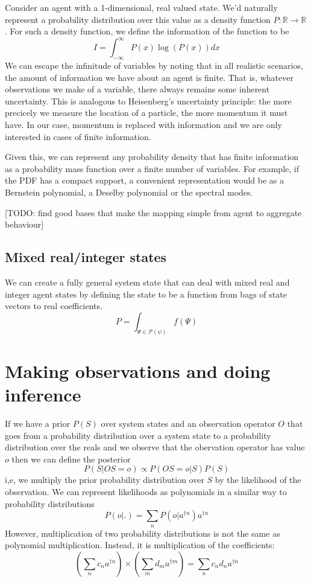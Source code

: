 \documentclass[letterpaper,twocolumn,10pt]{article}
\begin{document}
Consider an agent with a 1-dimensional, real valued state. We'd naturally represent a probability distribution over this value as a density function $P:\mathbb{R} \rightarrow \mathbb{R}$. For such a density function, we define the information of the function to be
\[
I = \int_{-\infty}^\infty P(x) \log(P(x)) dx
\]
We can escape the infinitude of variables by noting that in all realistic scenarios, the amount of information we have about an agent is finite. That is, whatever observations we make of a variable, there always remains some inherent uncertainty. This is analogous to Heisenberg's uncertainty principle: the more precicely we measure the location of a particle, the more momentum it must have. In our case, momentum is replaced with information and we are only interested in cases of finite information.

Given this, we can represent any probability density that has finite information as a probability mass function over a finite number of variables. For example, if the PDF has a compact support, a convenient representation would be as a Bernstein polynomial, a Deselby polynomial or the spectral modes.

[TODO: find good bases that make the mapping simple from agent to aggregate behaviour]

\subsection{Mixed real/integer states}
 We can create a fully general system state that can deal with mixed real and integer agent states by defining the state to be a function from bags of state vectors to real coefficients.
 \[
 P = \int_{\Psi\in\mathcal{P}(\psi)} f(\Psi)
 \]

\section{Making observations and doing inference}

If we have a prior $P(S)$ over system states and an observation operator $O$ that goes from a probability distribution over a system state to a probability distribution over the reals and we observe that the obervation operator has value $o$ then we can define the posterior
\[
P(S|OS = o) \propto P(OS=o|S)P(S)
\]
i,e, we multiply the prior probability distribution over $S$ by the likelihood of the observation. We can represent likelihoods as polynomials in a similar way to probability distributions
\[
P(o|.) = \sum_n P(o|a^{\dag n})a^{\dag n}
\]
However, multiplication of two probability distributions is not the same as polynomial multiplication. Instead, it is multiplication of the coefficients:
\[
\left(\sum_n c_n a^{\dag n}\right) \times \left(\sum_m d_m a^{\dag m}\right) = \sum_n c_nd_n a^{\dag n}
\]
\end{document}
